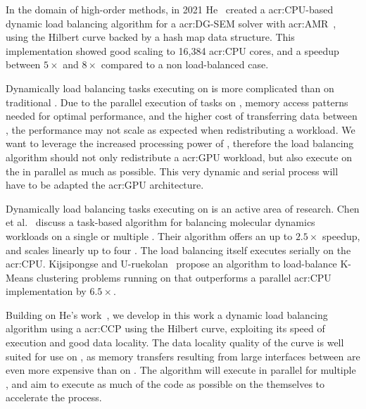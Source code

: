 In the domain of high-order methods, in 2021 He~\cite{He2021} created a \acrshort{acr:CPU}-based
dynamic load balancing algorithm for a \acrshort{acr:DG-SEM} solver with
\acrshort{acr:AMR}~\cite{He2021}, using the Hilbert curve backed by a hash map data structure. This
implementation showed good scaling to 16,384 \acrshort{acr:CPU} cores, and a speedup between \(5
\times \) and \(8 \times \) compared to a non load-balanced case.

Dynamically load balancing tasks executing on  is more complicated than on
traditional . Due to the parallel execution of tasks on ,
memory access patterns needed for optimal performance, and the higher cost of transferring data
between , the performance may not scale as expected when redistributing a
workload. We want to leverage the increased processing power of , therefore the
load balancing algorithm should not only redistribute a \acrshort{acr:GPU} workload, but also
execute on the  in parallel as much as possible. This very dynamic and serial
process will have to be adapted the \acrshort{acr:GPU} architecture.

Dynamically load balancing tasks executing on  is an active area of research.
Chen et al.~\cite{Chen2010} discuss a task-based algorithm for balancing molecular dynamics
workloads on a single or multiple . Their algorithm offers an up to \(2.5 \times
\) speedup, and scales linearly up to four . The load balancing itself executes
serially on the \acrshort{acr:CPU}. Kijsipongse and U-ruekolan~\cite{Kijsipongse2012} propose an
algorithm to load-balance K-Means clustering problems running on  that
outperforms a parallel \acrshort{acr:CPU} implementation by \(6.5 \times \).

Building on He's work~\cite{He2021}, we develop in this work a dynamic load balancing algorithm
using a \acrshort{acr:CCP} using the Hilbert curve, exploiting its speed of execution and good data
locality. The data locality quality of the curve is well suited for use on , as
memory transfers resulting from large interfaces between  are even more
expensive than on . The algorithm will execute in parallel for multiple
, and aim to execute as much of the code as possible on the 
themselves to accelerate the process.
